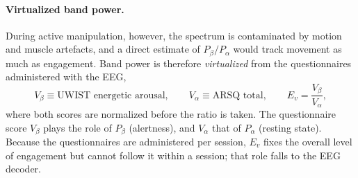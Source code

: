 \documentclass[utf8]{frontiers_suppmat}
\begin{document}
\paragraph*{Virtualized band power.} During active manipulation, however, the spectrum is contaminated by motion and muscle artefacts, and a direct estimate of $P_\beta/P_\alpha$ would track movement as much as engagement. Band power is therefore \emph{virtualized} from the questionnaires administered with the EEG,
\begin{equation}\label{eq:virtual}
V_\beta\equiv\text{UWIST energetic arousal},\qquad V_\alpha\equiv\text{ARSQ total},\qquad E_v=\frac{V_\beta}{V_\alpha},
\end{equation}
where both scores are normalized before the ratio is taken. The questionnaire score $V_\beta$ plays the role of $P_\beta$ (alertness), and $V_\alpha$ that of $P_\alpha$ (resting state). Because the questionnaires are administered per session, $E_v$ fixes the overall level of engagement but cannot follow it within a session; that role falls to the EEG decoder.
\end{document}
